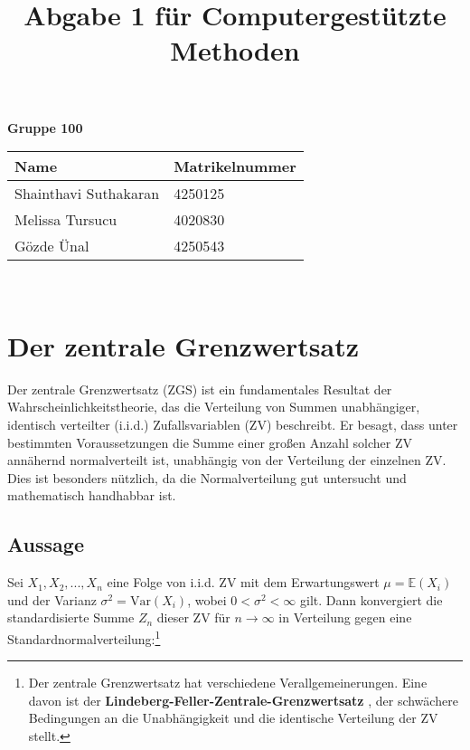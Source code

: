 \documentclass[a4paper, 12pt]{article}
\title{Abgabe 1 für Computergestützte Methoden}
\author{}
\date{}
\begin{document}
\maketitle
\begin{center}  
    \textbf{Gruppe 100} \\[1 cm]
    
    \begin{tabular}{l | l}
        \textbf{Name} & \textbf{Matrikelnummer} \\ \hline
        Shainthavi Suthakaran & 4250125 \\
        Melissa Tursucu & 4020830 \\
        Gözde Ünal & 4250543 \\
    \end{tabular} \\[1cm]
\end{center}

\vspace{\baselineskip}

\maketitle
\tableofcontents

\newpage


\section{Der zentrale Grenzwertsatz}

Der zentrale Grenzwertsatz (ZGS) ist ein fundamentales Resultat der Wahrscheinlichkeitstheorie, das die Verteilung von Summen unabhängiger, identisch verteilter (i.i.d.) Zufallsvariablen (ZV) beschreibt. Er besagt, dass unter bestimmten Voraussetzungen die Summe einer großen Anzahl solcher ZV annähernd normalverteilt ist, unabhängig von der Verteilung der einzelnen ZV. Dies ist besonders nützlich, da die Normalverteilung gut untersucht und mathematisch handhabbar ist.

\subsection{Aussage}
Sei \( X_1, X_2,..., X_n \) eine Folge von i.i.d. ZV mit dem Erwartungswert \( \mu = \mathbb{E}(X_i) \) und der Varianz \( \sigma^2 = \mathrm{Var}(X_i) \), wobei \( 0 < \sigma^2 < \infty \) gilt. Dann konvergiert die standardisierte Summe \( Z_n \) dieser ZV für \( n \to \infty \) in Verteilung gegen eine Standardnormalverteilung:\footnote{Der zentrale Grenzwertsatz hat verschiedene Verallgemeinerungen. Eine davon ist der
\textbf{Lindeberg-Feller-Zentrale-Grenzwertsatz} 
\cite[Seite 328]{1}, der schwächere Bedingungen an die Unabhängigkeit und die identische Verteilung der ZV stellt.}
\end{document}
